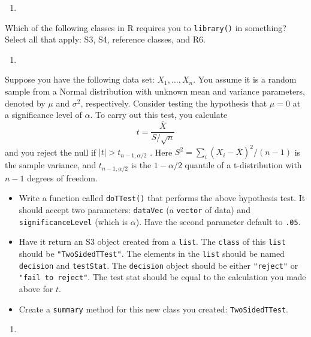 \documentclass[
  12pt,
  krantz2]{krantz}
\providecommand{\tightlist}{%
  \setlength{\itemsep}{0pt}\setlength{\parskip}{0pt}}
\begin{document}
\begin{enumerate}
\def\labelenumi{\arabic{enumi}.}
\setcounter{enumi}{7}
\tightlist
\item
\end{enumerate}

Which of the following classes in R requires you to \texttt{library()} in something? Select all that apply: S3, S4, reference classes, and R6.

\begin{enumerate}
\def\labelenumi{\arabic{enumi}.}
\setcounter{enumi}{8}
\tightlist
\item
\end{enumerate}

Suppose you have the following data set: \(X_1, \ldots, X_n\). You assume it is a random sample from a Normal distribution with unknown mean and variance parameters, denoted by \(\mu\) and \(\sigma^2\), respectively. Consider testing the hypothesis that \(\mu = 0\) at a significance level of \(\alpha\). To carry out this test, you calculate
\[
t = \frac{\bar{X}}{S/\sqrt{n}}
\]
and you reject the null if \(|t| > t_{n-1,\alpha/2}\) \citep{student1908probable}. Here \(S^2 = \sum_i(X_i - \bar{X})^2 / (n-1)\) is the sample variance, and \(t_{n-1,\alpha/2}\) is the \(1-\alpha/2\) quantile of a t-distribution with \(n-1\) degrees of freedom.

\begin{itemize}
\tightlist
\item
  Write a function called \texttt{doTTest()} that performs the above hypothesis test. It should accept two parameters: \texttt{dataVec} (a \texttt{vector} of data) and \texttt{significanceLevel} (which is \(\alpha\)). Have the second parameter default to \texttt{.05}.
\item
  Have it return an S3 object created from a \texttt{list}. The \texttt{class} of this \texttt{list} should be \texttt{"TwoSidedTTest"}. The elements in the \texttt{list} should be named \texttt{decision} and \texttt{testStat}. The \texttt{decision} object should be either \texttt{"reject"} or \texttt{"fail\ to\ reject"}. The test stat should be equal to the calculation you made above for \(t\).
\item
  Create a \texttt{summary} method for this new class you created: \texttt{TwoSidedTTest}.
\end{itemize}

\begin{enumerate}
\def\labelenumi{\arabic{enumi}.}
\setcounter{enumi}{9}
\tightlist
\item
\end{enumerate}
\end{document}
